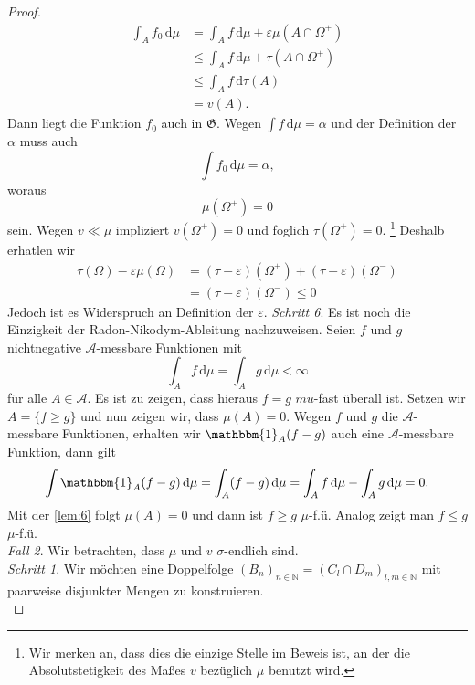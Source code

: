 \documentclass[/Users/zhangwusheng/Documents/satz von radon nikodym/satz von radon nikodym.tex]{subfiles}
\begin{document}
\begin{proof}
        \begin{align*}
            \int_A f_0\,\mathrm{d}\mu &= \int_A f\,\mathrm{d}\mu + \varepsilon \mu(A \cap \Omega^{+})\\
            &\leq \int_A f\,\mathrm{d}\mu + \tau(A \cap \Omega^{+})\\
            &\leq \int_A f\,\mathrm{d}\tau(A)\\
            &=v(A).
        \end{align*}
        Dann liegt die Funktion $f_0$ auch in $\mathfrak{G}$. Wegen $\int f\,\mathrm{d}\mu = \alpha$ und der Definition der $\alpha$ muss auch 
        \[\int f_0\,\mathrm{d}\mu = \alpha,\]
        woraus 
        \[\mu(\Omega^{+}) =0\]
        sein. Wegen $v \ll \mu$ impliziert $v(\Omega^{+}) =0$ und foglich $\tau(\Omega^{+}) =0$. \footnote{Wir merken an, dass dies die einzige Stelle im Beweis ist, an der die Absolutstetigkeit des Maßes $v$ 
        bezüglich $\mu$ benutzt wird.} Deshalb erhatlen wir 
        \begin{align*}
            \tau(\Omega) - \varepsilon \mu(\Omega) &= (\tau - \varepsilon)(\Omega^{+}) + (\tau - \varepsilon)(\Omega^-)\\
            &= (\tau - \varepsilon)(\Omega^{-}) \leq 0
        \end{align*}
        Jedoch ist es Widerspruch an Definition der $\varepsilon$. 
        \textit{Schritt 6}. Es ist noch die Einzigkeit der Radon-Nikodym-Ableitung nachzuweisen. Seien $f$ und $g$ nichtnegative $\mathcal{A}$-messbare Funktionen mit 
        \[\int_A f\,\mathrm{d}\mu = \int_A g\,\mathrm{d}\mu < \infty\]
        für alle $A \in \mathcal{A}$. Es ist zu zeigen, dass hieraus $f = g$ $mu$-fast überall ist. Setzen wir $A= \{f \geq g\}$ und nun zeigen wir, dass $\mu(A) =0$. Wegen $f$ und $g$ die $\mathcal{A}$-messbare Funktionen, 
        erhalten wir $\mathbbm{1}_A (f-g)$ auch eine $\mathcal{A}$-messbare Funktion, dann gilt 
        \[\int \mathbbm{1}_A (f-g)\,\mathrm{d}\mu = \int_A (f-g)\,\mathrm{d}\mu = \int_A f\,\mathrm{d}\mu - \int_A g\,\mathrm{d}\mu = 0.\]
        Mit der \cref{lem:6} folgt $\mu(A) =0$ und dann ist $f \geq g$ $\mu$-f.ü. Analog zeigt man $f \leq g$ $\mu$-f.ü.\\
        \textit{Fall 2}. Wir betrachten, dass $\mu$ und $v$ $\sigma$-endlich sind.\\
        \textit{Schritt 1}. Wir möchten eine Doppelfolge $(B_n)_{n \in \mathbb{N}} = (C_l \cap D_m)_{l, m \in \mathbb{N}}$ mit paarweise disjunkter Mengen zu konstruieren.\\

\end{proof}
\end{document}
